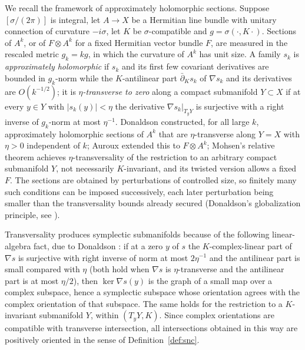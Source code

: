 \documentclass[11pt]{article}
\theoremstyle{remark}
\begin{document}
We recall the framework of approximately holomorphic sections. Suppose
$[\sigma/(2\pi)]$ is integral, let $A\to X$ be a Hermitian line bundle
with unitary connection of curvature $-i\sigma$, let $K$ be
$\sigma$-compatible and $g=\sigma(\cdot,K\cdot)$. Sections of $A^k$, or
of $F\otimes A^k$ for a fixed Hermitian vector bundle $F$, are measured
in the rescaled metric $g_k=kg$, in which the curvature of $A^k$ has
unit size. A family $s_k$ is \emph{approximately holomorphic} if $s_k$
and its first few covariant derivatives are bounded in $g_k$-norm while
the $K$-antilinear part $\bar\partial_Ks_k$ of $\nabla s_k$ and its
derivatives are $O(k^{-1/2})$; it is
\emph{$\eta$-transverse to zero} along a compact submanifold
$Y\subset X$ if at every $y\in Y$ with $|s_k(y)|<\eta$ the derivative
$\nabla s_k|_{T_yY}$ is surjective with a right inverse of $g_k$-norm
at most $\eta^{-1}$. Donaldson \cite{Donaldson1996} constructed, for
all large $k$, approximately holomorphic sections of $A^k$ that are
$\eta$-transverse along $Y=X$ with $\eta>0$ independent of $k$; Auroux
\cite[Theorem 2 and Corollary 1]{Auroux1997} extended this to
$F\otimes A^k$; Mohsen's relative theorem \cite[p.~657]{Mohsen2019}
achieves $\eta$-transversality of the restriction to an arbitrary
compact submanifold $Y$, not necessarily $K$-invariant, and its
twisted version \cite[p.~662]{Mohsen2019} allows a fixed $F$. The
sections are obtained by perturbations of controlled size, so finitely
many such conditions can be imposed successively, each later
perturbation being smaller than the transversality bounds already
secured (Donaldson's globalization principle, see
\cite[Proposition 4.1]{Auroux2001}).

Transversality produces symplectic submanifolds because of the
following linear-algebra fact, due to Donaldson \cite{Donaldson1996}:
if at a zero $y$ of $s$ the $K$-complex-linear part of $\nabla s$ is
surjective with right inverse of norm at most $2\eta^{-1}$ and the
antilinear part is small compared with $\eta$ (both hold when $\nabla s$
is $\eta$-transverse and the antilinear part is at most $\eta/2$), then
$\ker\nabla s(y)$ is the graph of a small map over a complex subspace,
hence a symplectic subspace whose orientation agrees with the complex
orientation of that subspace. The same holds for the restriction to a
$K$-invariant submanifold $Y$, within $(T_yY,K)$. Since complex
orientations are compatible with transverse intersection, all
intersections obtained in this way are positively oriented in the
sense of Definition~\ref{def:snc}.
\end{document}
